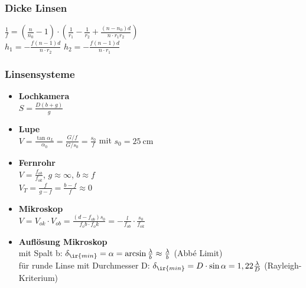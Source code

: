 \documentclass[german]{latex4ei/latex4ei_sheet}
\begin{document}
\begin{sectionbox}
\subsubsection{Dicke Linsen}
$\frac{1}{f}=(\frac{n}{n_0}-1)\cdot(\frac{1}{r_1}-\frac{1}{r_2}+\frac{(n-n_0)d}{n \cdot r_1 r_2})$\\
$h_1=-\frac{f(n-1)d}{n \cdot r_2}$ \qquad $h_2=-\frac{f(n-1)d}{n \cdot r_1}$

\subsubsection{Linsensysteme}
\begin{itemize}
	\item \textbf{Lochkamera} \\
		$S=\frac{D(b+g)}{g}$
	\item \textbf{Lupe} \\
		$V=\frac{\tan \alpha_L}{\alpha_0}=\frac{G/f}{G/s_0}=\frac{s_0}{f}$ mit $s_0=\SI{25}{\centi \meter}$
	\item \textbf{Fernrohr} \\
		$V=\frac{f_{ob}}{f_{ok}}$, $g\approx \infty$, $b\approx f$ \\
		$V_T=\frac{f}{g-f}=\frac{b-f}{f}\approx 0$
	\item \textbf{Mikroskop} \\
		$V=V_{ok}\cdot V_{ob}=\frac{(d-f_{ob})s_0}{f_ob \cdot f_ok}=-\frac{l}{f_{ob}}\cdot \frac{s_0}{f_{ok}}$
	\item \textbf{Auflösung Mikroskop} \\
	mit Spalt b: $\delta_{\ir{min}} = \alpha = \arcsin\frac{\lambda}{b} \approx \frac{\lambda}{b}$ (Abbé Limit)\\
	für runde Linse mit Durchmesser D: $\delta_{\ir{min}} = D\cdot\sin\alpha = 1,22\frac{\lambda}{D}$ (Rayleigh-Kriterium)\\
\end{itemize}
\end{sectionbox}
\end{document}
